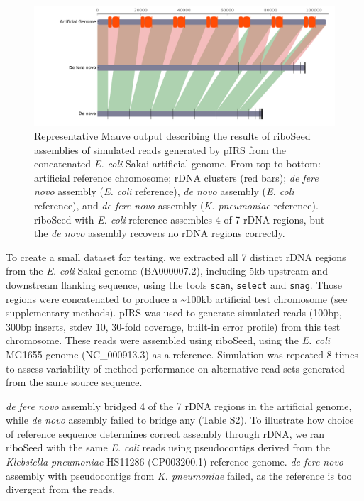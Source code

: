 \documentclass[a4,center,fleqn]{NAR}
\begin{document}
\begin{figure}[!b]
    \centering
    \hspace*{-.7cm}\includegraphics[width=1.2\columnwidth]{PrettyMauve}
    \caption{Representative Mauve output describing the results of riboSeed assemblies of simulated reads generated by pIRS from the concatenated \textit{E. coli} Sakai artificial genome. From top to bottom: artificial reference chromosome; rDNA clusters (red bars); \textit{de fere novo} assembly (\textit{E. coli} reference), \textit{de novo} assembly (\textit{E. coli} reference), and \textit{de fere novo} assembly (\textit{K. pneumoniae} reference). riboSeed with \textit{E. coli} reference assembles 4 of 7 rDNA regions, but the \textit{de novo} assembly recovers no rDNA regions correctly.
}
\label{fig:artificial}
\end{figure}


To create a small dataset for testing, we extracted all 7 distinct rDNA regions from the \textit{E. coli} Sakai genome (BA000007.2), including 5kb upstream and downstream flanking sequence, using the tools \texttt{scan}, \texttt{select} and \texttt{snag}. Those regions were concatenated to produce a \textasciitilde100kb artificial test chromosome (see supplementary methods). pIRS\cite{Hu2012} was used to generate simulated reads (100bp, 300bp inserts, stdev 10, 30-fold coverage, built-in error profile) from this test chromosome. These reads were assembled using riboSeed, using the \textit{E. coli} MG1655 genome (NC\_000913.3) as a reference.  Simulation was repeated 8 times to assess variability of method performance on alternative read sets generated from the same source sequence.


\textit{de fere novo} assembly bridged 4 of the 7 rDNA regions in the artificial genome, while \textit{de novo} assembly failed to bridge any (Table S2). To illustrate how choice of reference sequence determines correct assembly through rDNA, we ran riboSeed with the same \textit{E. coli} reads using pseudocontigs derived from the \textit{Klebsiella pneumoniae} HS11286 (CP003200.1) reference genome\cite{Liu2012}. \textit{de fere novo} assembly with pseudocontigs from \textit{K. pneumoniae} failed, as the reference is too divergent from the reads.
\end{document}
